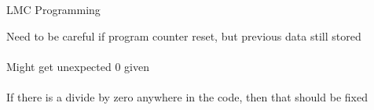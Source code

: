 \documentclass{article}[18pt]
\begin{document}
\begin{center}{LMC Programming}
\end{center}
Need to be careful if program counter reset, but previous data still stored\\
\\
Might get unexpected 0 given\\
\\
If there is a divide by zero anywhere in the code, then that should be fixed
\end{document}
